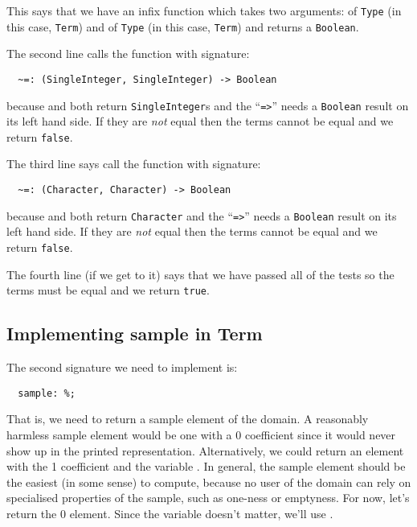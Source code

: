 This says that we have an infix function \ttin{=} which takes two
arguments:  of \verb"Type" \ttin{\%} (in this case, \verb"Term") and
 of \verb"Type" \ttin{\%} (in this case, \verb"Term") and returns a
\verb"Boolean".%

The second line calls the function with signature:

\begin{small}
\begin{verbatim}
  ~=: (SingleInteger, SingleInteger) -> Boolean
\end{verbatim}
\end{small}

because  and  both return
{\tt SingleInteger}s and the ``\verb+=>+'' needs a \verb"Boolean" result on its left
hand side. If they are {\em not} equal then the terms cannot be equal
and we return \verb"false".

The third line says call the function with signature:

\begin{small}
\begin{verbatim}
  ~=: (Character, Character) -> Boolean
\end{verbatim}
\end{small}

because  and  both return \verb"Character"
and the ``\verb+=>+'' needs a \verb"Boolean" result on its left hand side. If
they are {\em not} equal then the terms cannot be equal and we return
\verb"false".

The fourth line (if we get to it) says that we have passed all of the
tests so the terms must be equal and we return \verb"true".

\subsection{Implementing sample in Term}

The second signature we need to implement is:

\begin{small}
\begin{verbatim}
  sample: %;
\end{verbatim}
\end{small}

That is, we need to return a sample element of the domain. A
reasonably harmless sample element would be one with a 0 coefficient
since it would never show up in the printed
representation. Alternatively, we could return an element with the 1
coefficient and the variable . In general, the sample element
should be the easiest (in some sense) to compute, because no user of
the domain can rely on specialised properties of the sample, such as
one-ness
or emptyness.  For now, let's return the 0 element. Since the variable
doesn't matter, we'll use .

